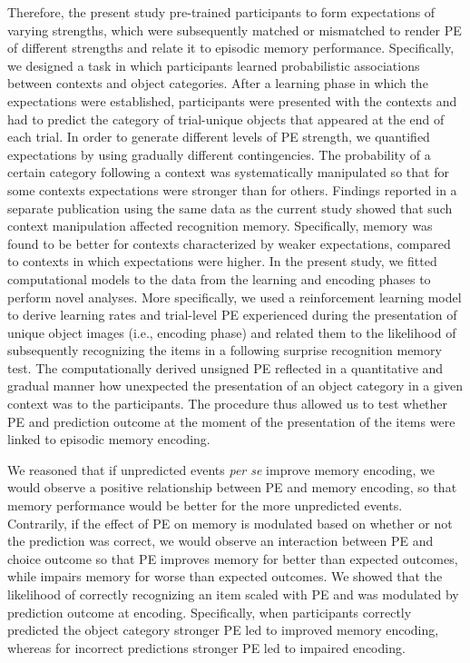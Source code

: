 \documentclass[a4paper,12pt]{article}
\begin{document}
\par Therefore, the present study pre-trained participants to form expectations of varying strengths, which were subsequently matched or mismatched to render PE of different strengths and relate it to episodic memory performance. Specifically, we designed a task in which participants learned probabilistic associations between contexts and object categories. After a learning phase in which the expectations were established, participants were presented with the contexts and had to predict the category of trial-unique objects that appeared at the end of each trial. In order to generate different levels of PE strength, we quantified expectations by using gradually different contingencies. The probability of a certain category following a context was systematically manipulated so that for some contexts expectations were stronger than for others.
Findings reported in a separate publication using the same data as the current study \citep{ortiz2021not} showed that such context manipulation affected recognition memory. Specifically, memory was found to be better for contexts characterized by weaker expectations, compared to contexts in which expectations were higher. In the present study, we fitted computational models to the data from the learning and encoding phases to perform novel analyses. More specifically, we used a reinforcement learning model to derive learning rates and trial-level PE experienced during the presentation of unique object images (i.e., encoding phase) and related them to the likelihood of subsequently recognizing the items in a following surprise recognition memory test. The computationally derived unsigned PE reflected in a quantitative and gradual manner how unexpected the presentation of an object category in a given context was to the participants. The procedure thus allowed us to test whether PE and prediction outcome at the moment of the presentation of the items were linked to episodic memory encoding. 
\par
 We reasoned that if unpredicted events \textit{per se} improve memory encoding, we would observe a positive relationship between PE and memory encoding, so that memory performance would be better for the more unpredicted events. Contrarily, if the effect of PE on memory is modulated based on whether or not the prediction was correct, we would observe an interaction between PE and choice outcome so that PE improves memory for better than expected outcomes, while impairs memory for worse than expected outcomes. We showed that the likelihood of correctly recognizing an item scaled with PE and was modulated by prediction outcome at encoding. Specifically, when participants correctly predicted the object category stronger PE led to improved memory encoding, whereas for incorrect predictions stronger PE led to impaired encoding. %
\end{document}
